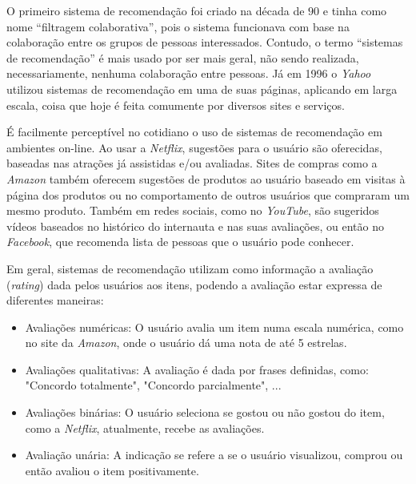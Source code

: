 \documentclass[12pt,a4paper,header]{abnt}
\begin{document}
O primeiro sistema de recomendação foi criado na década de $90$ e tinha como nome ``filtragem colaborativa'', pois o sistema funcionava com base na colaboração entre os grupos de pessoas interessados. Contudo, o termo ``sistemas de recomendação'' é mais usado por ser mais geral, não sendo realizada, necessariamente, nenhuma colaboração entre pessoas\cite{reategui2005sistemas}. Já em 1996 o \textit{Yahoo} utilizou sistemas de recomendação em uma de suas páginas, aplicando em larga escala\cite{reategui2005sistemas}, coisa que hoje é feita comumente por diversos sites e serviços.

É facilmente perceptível no cotidiano o uso de sistemas de recomendação em ambientes on-line. Ao usar a \textit{Netflix}, sugestões para o usuário são oferecidas, baseadas nas atrações já assistidas e/ou avaliadas. Sites de compras como a \textit{Amazon} também oferecem sugestões de produtos ao usuário baseado em visitas à página dos produtos ou no comportamento de outros usuários que compraram um mesmo produto. Também em redes sociais, como no \textit{YouTube}, são sugeridos vídeos baseados no histórico do internauta e nas suas avaliações, ou então no \textit{Facebook}, que recomenda lista de pessoas que o usuário pode conhecer\cite{gorakala2015building}.

Em geral, sistemas de recomendação utilizam como informação a avaliação (\textit{rating}) dada pelos usuários aos itens, podendo a avaliação estar expressa de diferentes maneiras\cite{shapira2011recommender}:

\begin{itemize}

\item Avaliações numéricas: O usuário avalia um item numa escala numérica, como no site da \textit{Amazon}, onde o usuário dá uma nota de até 5 estrelas.

\item Avaliações qualitativas: A avaliação é dada por frases definidas, como: "Concordo totalmente", "Concordo parcialmente", ...

\item Avaliações binárias: O usuário seleciona se gostou ou não gostou do item, como a \textit{Netflix}, atualmente, recebe as avaliações.

\item Avaliação unária: A indicação se refere a se o usuário visualizou, comprou ou então avaliou o item positivamente.

\end{itemize}
\end{document}

